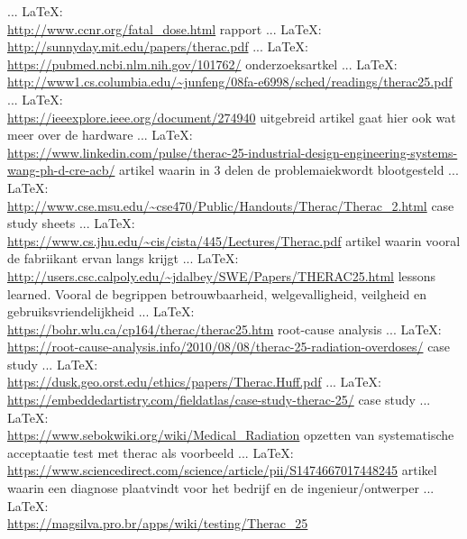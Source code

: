 \begin{thebibliography}{99}
 ... \LaTeX:\\ \url{http://www.ccnr.org/fatal_dose.html}
rapport
 ... \LaTeX:\\ \url{http://sunnyday.mit.edu/papers/therac.pdf}
 ... \LaTeX:\\ \url{https://pubmed.ncbi.nlm.nih.gov/101762/}
onderzoeksartkel
 ... \LaTeX:\\ \url{http://www1.cs.columbia.edu/~junfeng/08fa-e6998/sched/readings/therac25.pdf}
 ... \LaTeX:\\ \url{https://ieeexplore.ieee.org/document/274940}
uitgebreid artikel gaat hier ook wat meer over de hardware
 ... \LaTeX:\\ \url{https://www.linkedin.com/pulse/therac-25-industrial-design-engineering-systems-wang-ph-d-cre-acb/}
artikel waarin in 3 delen de problemaiekwordt blootgesteld
 ... \LaTeX:\\ \url{http://www.cse.msu.edu/~cse470/Public/Handouts/Therac/Therac_2.html}
case study sheets
 ... \LaTeX:\\ \url{https://www.cs.jhu.edu/~cis/cista/445/Lectures/Therac.pdf}
artikel waarin vooral de fabriikant ervan langs krijgt
 ... \LaTeX:\\ \url{http://users.csc.calpoly.edu/~jdalbey/SWE/Papers/THERAC25.html}
lessons learned. Vooral de begrippen betrouwbaarheid, welgevalligheid, veilgheid en gebruiksvriendelijkheid
 ... \LaTeX:\\ \url{https://bohr.wlu.ca/cp164/therac/therac25.htm}
root-cause analysis
 ... \LaTeX:\\ \url{https://root-cause-analysis.info/2010/08/08/therac-25-radiation-overdoses/}
case study
 ... \LaTeX:\\ \url{https://dusk.geo.orst.edu/ethics/papers/Therac.Huff.pdf}
 ... \LaTeX:\\ \url{https://embeddedartistry.com/fieldatlas/case-study-therac-25/}
case study
 ... \LaTeX:\\ \url{https://www.sebokwiki.org/wiki/Medical_Radiation}
opzetten van systematische acceptaatie test met therac als voorbeeld
 ... \LaTeX:\\ \url{https://www.sciencedirect.com/science/article/pii/S1474667017448245}
artikel waarin een diagnose plaatvindt voor het bedrijf en de ingenieur/ontwerper
 ... \LaTeX:\\ \url{https://magsilva.pro.br/apps/wiki/testing/Therac_25}

\end{thebibliography}
